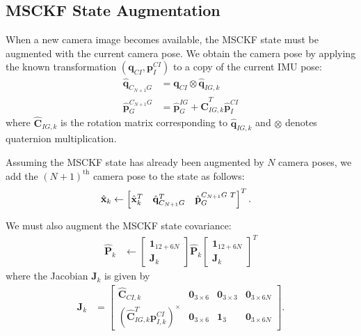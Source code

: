 \documentclass[letterpaper, 10 pt, conference]{ieeeconf}  %
\def\Vec#1{\mathbf{#1}}
\newcommand{\bbm}{\begin{bmatrix}}
\newcommand{\ebm}{\end{bmatrix}}
\begin{document}
\subsection{MSCKF State Augmentation}
When a new camera image becomes available, the MSCKF state must be augmented with the current camera pose.
We obtain the camera pose by applying the known transformation $\left(\Vec{q}_{CI}, \Vec{p}_I^{CI}\right)$ to a copy of the current IMU pose:
\begin{align}
    \hat{\Vec{q}}_{C_{N+1} G} &= \Vec{q}_{CI} \otimes \hat{\Vec{q}}_{IG,k} \\
    \hat{\Vec{p}}_G^{C_{N+1}G} &= \hat{\Vec{p}}_G^{IG} + \hat{\Vec{C}}_{IG,k}^T \hat{\Vec{p}}_I^{CI}
\end{align}
where $\hat{\Vec{C}}_{IG,k}$ is the rotation matrix corresponding to $\hat{\Vec{q}}_{IG,k}$ and $\otimes$ denotes quaternion multiplication.

Assuming the MSCKF state has already been augmented by $N$ camera poses, we add the $\left(N+1\right)^\text{th}$ camera pose to the state as follows:
\begin{align}
    \hat{\Vec{x}}_k &\leftarrow \bbm \hat{\Vec{x}}_k^T & \hat{\Vec{q}}_{C_{N+1} G}^T & \hat{\Vec{p}}_G^{C_{N+1} G \hspace{0.3em} T} \ebm^T .
\end{align}

We must also augment the MSCKF state covariance:
\begin{align}
    \hat{\Vec{P}}_k &\leftarrow \bbm \Vec{1}_{12+6N} \\ \Vec{J}_k \ebm \hat{\Vec{P}}_k \bbm \Vec{1}_{12+6N} \\ \Vec{J}_k \ebm^T
\end{align}
where the Jacobian $\Vec{J}_k$ is given by
\begin{align}
\Vec{J}_k &= \bbm \hat{\Vec{C}}_{C I, k} & \Vec{0}_{3\times6} & \Vec{0}_{3\times3} & \Vec{0}_{3\times6N} \\
                            \left(\hat{\Vec{C}}_{I G, k}^T \Vec{p}_{I,k}^{CI}\right)^\times & \Vec{0}_{3\times6} & \Vec{1}_3 & \Vec{0}_{3\times6N}
                \ebm .
\end{align}
\end{document}
